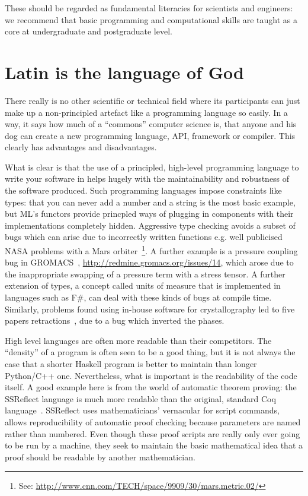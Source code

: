 \documentclass[conference]{IEEEtran}
\begin{document}
These should be regarded as fundamental literacies for scientists and
engineers: we recommend that basic programming and computational
skills are taught as a core at undergraduate and postgraduate level.


\section{Latin is the language of God} 

There really is no other scientific or technical field where its
participants can just make up a non-principled artefact like a
programming language so easily. In a way, it says how much of a
``commons'' computer science is, that anyone and his dog can create a
new programming language, API, framework or compiler. This clearly has
advantages and disadvantages.

What is clear is that the use of a principled, high-level programming
language to write your software in helps hugely with the
maintainability and robustness of the software produced. Such
programming languages impose constraints like types: that you can
never add a number and a string is the most basic example, but ML's
functors provide princpled ways of plugging in components with their
implementations completely hidden. Aggressive type checking avoids a
subset of bugs which can arise due to incorrectly written functions
e.g. well publicised NASA problems with a Mars orbiter~\footnote{See:
\url{http://www.cnn.com/TECH/space/9909/30/mars.metric.02/}}.  A
further example is a pressure coupling bug in GROMACS~\cite{Hess2008},
\url{http://redmine.gromacs.org/issues/14}, which arose due to the
inappropriate swapping of a pressure term with a stress tensor.  A
further extension of types, a concept called units of measure that is
implemented in languages such as F\#, can deal with these kinds of
bugs at compile time. Similarly, problems found using in-house
software for crystallography led to five papers
retractions~\cite{Miller2006}, due to a bug which inverted the phases.

High level languages are often more readable than their
competitors. The ``density'' of a program is often seen to be a good
thing, but it is not always the case that a shorter Haskell program is
better to maintain than longer Python/C++ one. Nevertheless, what is
important is the readability of the code itself. A good example here
is from the world of automatic theorem proving: the SSReflect language
is much more readable than the original, standard Coq
language~\cite{GonthierZND13}. SSReflect uses mathematicians'
vernacular for script commands, allows reproducibility of automatic
proof checking because parameters are named rather than numbered. 
Even though these proof scripts are really only ever going to be
run by a machine, they seek to maintain the basic mathematical idea
that a proof should be readable by another mathematician.
\end{document}
